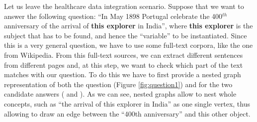 \begin{example}\label{ex:nestalign}
Let us leave the healthcare data integration scenario. Suppose that we want to answer the following question: ``In May 1898 Portugal celebrate the 400$^{th}$ anniversary of the arrival of \textbf{this explorer} in India'', where \textbf{this explorer} is the subject that has to be found, and hence the ``variable'' to be instantiated. Since this is a very general question, we have to use some full-text corpora, like the one from Wikipedia. From this full-text sources, we can extract different sentences from different pages and, at this step, we want to check which part of the text matches with our question. To do this we have to first provide a nested graph representation of both the question (Figure \vref{fig:question1}) and for the two candidate answers ( and ). As we can see, nested graphs allow to nest whole concepts, such as ``the arrival of this explorer in India'' as one single vertex, thus allowing to draw an edge between the ``400th anniversary'' and this other object.
	

\end{example}

